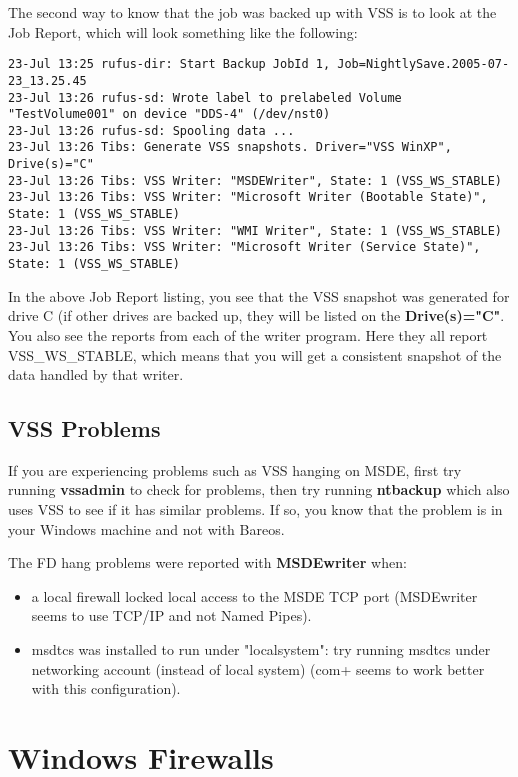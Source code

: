 The second way to know that the job was backed up with VSS is to look at the
Job Report, which will look something like the following:
\footnotesize
\begin{verbatim}
23-Jul 13:25 rufus-dir: Start Backup JobId 1, Job=NightlySave.2005-07-23_13.25.45
23-Jul 13:26 rufus-sd: Wrote label to prelabeled Volume "TestVolume001" on device "DDS-4" (/dev/nst0)
23-Jul 13:26 rufus-sd: Spooling data ...
23-Jul 13:26 Tibs: Generate VSS snapshots. Driver="VSS WinXP", Drive(s)="C"
23-Jul 13:26 Tibs: VSS Writer: "MSDEWriter", State: 1 (VSS_WS_STABLE)
23-Jul 13:26 Tibs: VSS Writer: "Microsoft Writer (Bootable State)", State: 1 (VSS_WS_STABLE)
23-Jul 13:26 Tibs: VSS Writer: "WMI Writer", State: 1 (VSS_WS_STABLE)
23-Jul 13:26 Tibs: VSS Writer: "Microsoft Writer (Service State)", State: 1 (VSS_WS_STABLE)
\end{verbatim}
\normalsize
In the above Job Report listing, you see that the VSS snapshot was generated for drive C (if
other drives are backed up, they will be listed on the {\bf Drive(s)="C"}.  You also see the
reports from each of the writer program.  Here they all report VSS\_WS\_STABLE, which means
that you will get a consistent snapshot of the data handled by that writer.

\subsection{VSS Problems}


If you are experiencing problems such as VSS hanging on MSDE, first try
running {\bf vssadmin} to check for problems, then try running {\bf
ntbackup} which also uses VSS to see if it has similar problems. If so, you
know that the problem is in your Windows machine and not with Bareos.

The FD hang problems were reported with {\bf MSDEwriter} when:
\begin{itemize}
\item a local firewall locked local access to the MSDE TCP port (MSDEwriter
seems to use TCP/IP and not Named Pipes).
\item msdtcs was installed to run under "localsystem": try running msdtcs
under  networking account (instead of local system) (com+ seems to work
better with this configuration).
\end{itemize}


\section{Windows Firewalls}

